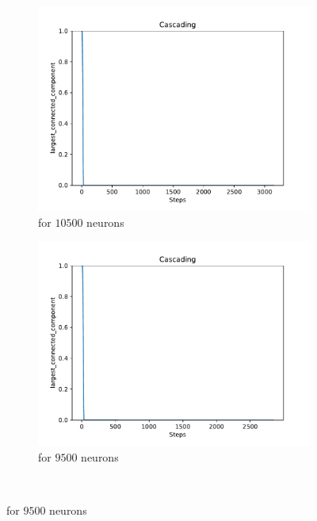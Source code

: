 \begin{figure}
	\centering
	\begin{subfigure}[b]{0.45\textwidth}
		\centering
		\includegraphics[width=\textwidth]{Images/plots_cascading/cascading_20.pdf}
		\caption{for $10500$ neurons}
	\end{subfigure}
	\hfill
	\begin{subfigure}[b]{0.45\textwidth}
		\centering
		\includegraphics[width=\textwidth]{Images/plots_cascading/cascading_22.pdf}
		\caption{for $9500$ neurons}
	\end{subfigure}
	\\ \vspace{5mm}

\end{figure}
